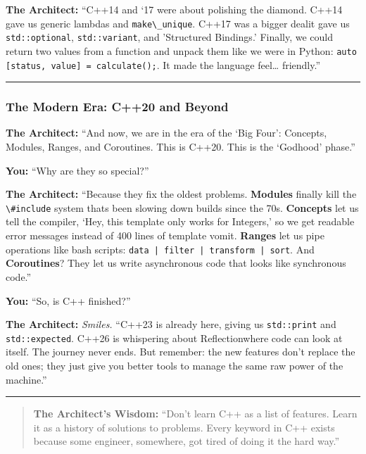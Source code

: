\textbf{The Architect:} ``C++14 and `17 were about polishing the
diamond. C++14 gave us generic lambdas and
\passthrough{\lstinline!make\_unique!}. C++17 was a bigger dealit gave
us \passthrough{\lstinline!std::optional!},
\passthrough{\lstinline!std::variant!}, and 'Structured Bindings.'
Finally, we could return two values from a function and unpack them like
we were in Python:
\passthrough{\lstinline!auto [status, value] = calculate();!}. It made
the language feel\ldots{} friendly.''

\begin{center}\rule{0.5\linewidth}{0.5pt}\end{center}

\hypertarget{the-modern-era-c20-and-beyond}{%
\subsubsection{The Modern Era: C++20 and
Beyond}\label{the-modern-era-c20-and-beyond}}

\textbf{The Architect:} ``And now, we are in the era of the `Big Four':
Concepts, Modules, Ranges, and Coroutines. This is C++20. This is the
`Godhood' phase.''

\textbf{You:} ``Why are they so special?''

\textbf{The Architect:} ``Because they fix the oldest problems.
\textbf{Modules} finally kill the \passthrough{\lstinline!\#include!}
system thats been slowing down builds since the 70s. \textbf{Concepts}
let us tell the compiler, `Hey, this template only works for Integers,'
so we get readable error messages instead of 400 lines of template
vomit. \textbf{Ranges} let us pipe operations like bash scripts:
\passthrough{\lstinline!data | filter | transform | sort!}. And
\textbf{Coroutines}? They let us write asynchronous code that looks like
synchronous code.''

\textbf{You:} ``So, is C++ finished?''

\textbf{The Architect:} \emph{Smiles.} ``C++23 is already here, giving
us \passthrough{\lstinline!std::print!} and
\passthrough{\lstinline!std::expected!}. C++26 is whispering about
Reflectionwhere code can look at itself. The journey never ends. But
remember: the new features don't replace the old ones; they just give
you better tools to manage the same raw power of the machine.''

\begin{center}\rule{0.5\linewidth}{0.5pt}\end{center}

\begin{quote}
\textbf{The Architect's Wisdom:} ``Don't learn C++ as a list of
features. Learn it as a history of solutions to problems. Every keyword
in C++ exists because some engineer, somewhere, got tired of doing it
the hard way.''
\end{quote}
